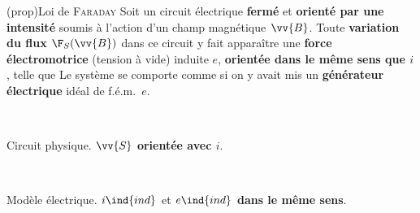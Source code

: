 \documentclass[../../main/main.tex]{subfiles}
\begin{document}
\begin{tcb*}[breakable](prop){Loi de \textsc{Faraday}}
	Soit un circuit électrique \textbf{fermé} et \textbf{orienté par une
		intensité} soumis à l'action d'un champ magnétique $\vv{B}$. Toute
	\textbf{variation du flux} $\F_S(\vv{B})$ dans ce circuit y fait apparaître
	une \textbf{force électromotrice} (tension à vide) induite $e$,
	\textbf{orientée dans le même sens que $i$}, telle que
	\psw{%
		\[
			\boxed{e\ind{ind}(t) =
				-\dv{\F}{t}} = -\dv{t} \iint_{S} \Bf \cdot \dd{S}
		\]
	}%
	Le système se comporte comme si on y avait mis un
	\textbf{générateur électrique} idéal de f.é.m.\ $e$.
	\smallbreak
	\hfill
	\noindent
	\begin{minipage}[c]{.4\linewidth}
		~
		\begin{center}
			\label{fig:fluxdef2}
			\smallbreak
			Circuit physique.
			\smallbreak
			$\vv{S}$ \textbf{orientée avec $i$}.
		\end{center}
	\end{minipage}
	\hfill
	\begin{minipage}[c]{.4\linewidth}
		~
		\begin{center}
			\label{fig:faraelec}
			\smallbreak
			Modèle électrique.
			\smallbreak
			$i\ind{ind}$ et $e\ind{ind}$ \textbf{dans le même sens}.
		\end{center}
	\end{minipage}
	\hfill~
\end{tcb*}
\end{document}
